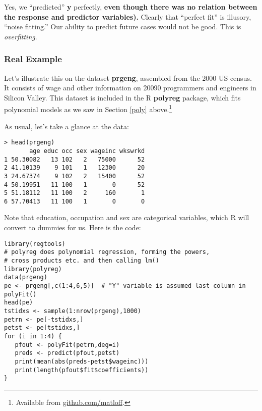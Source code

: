 Yes, we ``predicted'' \textbf{y} perfectly, \textbf{even though there
was no relation between the response and predictor variables).}
Clearly that ``perfect fit'' is illusory, ``noise fitting.''  Our
ability to predict future cases would not be good.  This is
\textit{overfitting}.

\subsubsection{Real Example}
\label{prgengex}

\iffalse
library(regtools)
# polyreg does polynomial regression, forming the powers, 
# cross products etc. and then calling lm()
library(polyreg)  
data(prgeng)
pe <- prgeng[,c(1:4,6,5)]  # "Y" variable is assumed last column in polyFit()
head(pe)
tstidxs <- sample(1:nrow(prgeng),1000) 
petrn <- pe[-tstidxs,]
petst <- pe[tstidxs,]
for (i in 1:10) {
   pfout <- polyFit(petrn,deg=i)
   preds <- predict(pfout,petst)
   print(mean(abs(preds-petst$wageinc)))
}
\fi

Let's illustrate this on the dataset \textbf{prgeng}, assembled from the
2000 US census.  It consists of wage and other information on
20090 programmers and engineers in Silicon Valley.  This dataset is
included in the R \textbf{polyreg} package, which fits polynomial models
as we saw in Section \ref{poly} above.\footnote{Available from
\url{github.com/matloff}.}  

As usual, let's take a glance at the data:

\begin{lstlisting}
> head(prgeng)
       age educ occ sex wageinc wkswrkd
1 50.30082   13 102   2   75000      52
2 41.10139    9 101   1   12300      20
3 24.67374    9 102   2   15400      52
4 50.19951   11 100   1       0      52
5 51.18112   11 100   2     160       1
6 57.70413   11 100   1       0       0
\end{lstlisting}

Note that education, occupation and sex are categorical variables,
which R will convert to dummies for us.  Here is the code:

\begin{lstlisting}
library(regtools)
# polyreg does polynomial regression, forming the powers, 
# cross products etc. and then calling lm()
library(polyreg)
data(prgeng)
pe <- prgeng[,c(1:4,6,5)]  # "Y" variable is assumed last column in polyFit()
head(pe)
tstidxs <- sample(1:nrow(prgeng),1000) 
petrn <- pe[-tstidxs,]
petst <- pe[tstidxs,]
for (i in 1:4) {
   pfout <- polyFit(petrn,deg=i)
   preds <- predict(pfout,petst)
   print(mean(abs(preds-petst$wageinc)))
   print(length(pfout$fit$coefficients))
}
\end{lstlisting}

